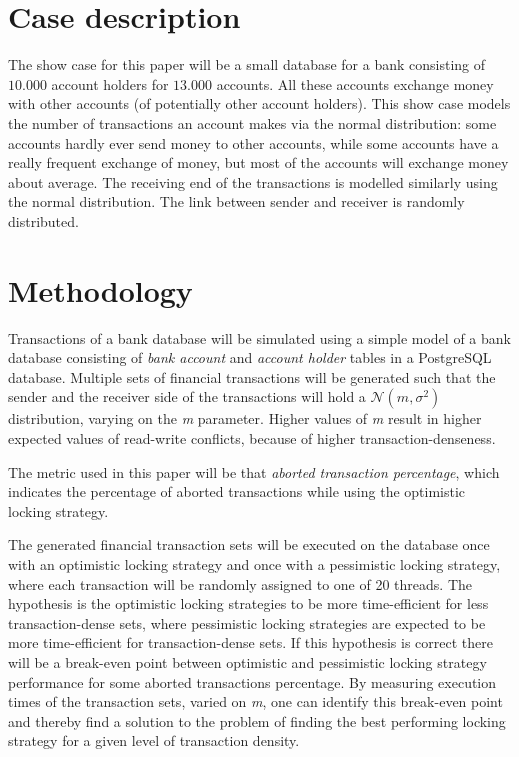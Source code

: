 \documentclass{sig-alternate-br}
\begin{document}
\section{Case description}
\label{sec:case}
The show case for this paper will be a small database for a bank consisting of $10.000$ account holders for $13.000$ accounts. All these accounts exchange money with other accounts (of potentially other account holders). This show case models the number of transactions an account makes via the normal distribution: some accounts hardly ever send money to other accounts, while some accounts have a really frequent exchange of money, but most of the accounts will exchange money about average. The receiving end of the transactions is modelled similarly using the normal distribution. The link between sender and receiver is randomly distributed.

\section{Methodology}
\label{sec:methodology}
Transactions of a bank database will be simulated using a simple model of a bank database consisting of \emph{bank account} and \emph{account holder} tables in a PostgreSQL database. Multiple sets of financial transactions will be generated such that the sender and the receiver side of the transactions will hold a $\mathcal{N} (m,\sigma^2)$ distribution, varying on the \emph{m} parameter. Higher values of \emph{m} result in higher expected values of read-write conflicts, because of higher transaction-denseness. 

The metric used in this paper will be that \emph{aborted transaction percentage}, which indicates the percentage of aborted transactions while using the optimistic locking strategy.

The generated financial transaction sets will be executed on the database once with an optimistic locking strategy and once with a pessimistic locking strategy, where each transaction will be randomly assigned to one of 20 threads. The hypothesis is the optimistic locking strategies to be more time-efficient for less transaction-dense sets, where pessimistic locking strategies are expected to be more time-efficient for transaction-dense sets. If this hypothesis is correct there will be a break-even point between optimistic and pessimistic locking strategy performance for some aborted transactions percentage. By measuring execution times of the transaction sets, varied on \emph{m}, one can identify this break-even point and thereby find a solution to the problem of finding the best performing locking strategy for a given level of transaction density. 
\end{document}
